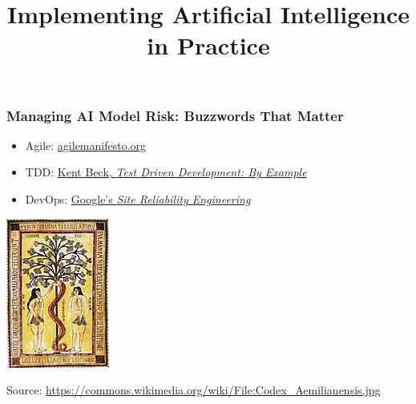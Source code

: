 

\title{Implementing Artificial Intelligence in Practice}

\maketitle

\begin{frame}
\frametitle{Managing AI Model Risk: Buzzwords That Matter}
\begin{itemize}
\item Agile: \href{https://agilemanifesto.org/}{agilemanifesto.org}
\item TDD: \href{https://www.oreilly.com/library/view/test-driven-development/0321146530/}{Kent Beck, {\it Test Driven Development: By Example}}
\item DevOps: \href{https://landing.google.com/sre/books/}{Google's {\it Site Reliability Engineering}}
\end{itemize}
\begin{center}
\includegraphics[height=0.35\textheight]{figures/Codex_Aemilianensis}
\end{center}
Source: \url{https://commons.wikimedia.org/wiki/File:Codex_Aemilianensis.jpg}
\end{frame}


